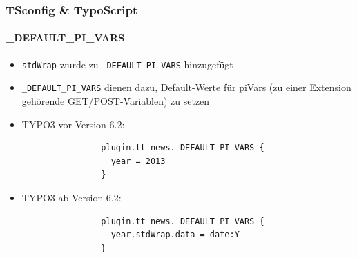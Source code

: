 
\begin{frame}[fragile]
	\frametitle{TSconfig \& TypoScript}
	\framesubtitle{\_DEFAULT\_PI\_VARS}

	\begin{itemize}
		\item \texttt{stdWrap} wurde zu \texttt{\_DEFAULT\_PI\_VARS} hinzugefügt
		\item \texttt{\_DEFAULT\_PI\_VARS} dienen dazu, Default-Werte für piVars (zu einer Extension gehörende GET/POST-Variablen) zu setzen

		\item TYPO3 vor Version 6.2:
			\begin{lstlisting}
				plugin.tt_news._DEFAULT_PI_VARS {
				  year = 2013
				}
			\end{lstlisting}

		\item TYPO3 ab Version 6.2:
			\begin{lstlisting}
				plugin.tt_news._DEFAULT_PI_VARS {
				  year.stdWrap.data = date:Y
				}
			\end{lstlisting}

	\end{itemize}

\end{frame}



